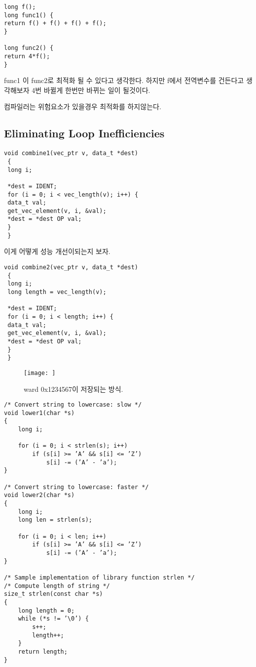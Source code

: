 \begin{lstlisting}[style = CStyle]
long f();
long func1() {
return f() + f() + f() + f();
}

long func2() {
return 4*f();
}
\end{lstlisting}
func1 이 func2로 최적화 될 수 있다고 생각한다. 하지만 f에서 전역변수를 건든다고 생각해보자 4번 바뀔게 한번만 바뀌는 일이 될것이다.

컴파일러는 위험요소가 있을경우 최적화를 하지않는다.

\subsection{Eliminating Loop Inefficiencies}

\begin{lstlisting}[style = CStyle]
void combine1(vec_ptr v, data_t *dest)
 {
 long i;

 *dest = IDENT;
 for (i = 0; i < vec_length(v); i++) {
 data_t val;
 get_vec_element(v, i, &val);
 *dest = *dest OP val;
 }
 }

\end{lstlisting}

이게 어떻게 성능 개선이되는지 보자.

\begin{lstlisting}[style = CStyle]
void combine2(vec_ptr v, data_t *dest)
 {
 long i;
 long length = vec_length(v);

 *dest = IDENT;
 for (i = 0; i < length; i++) {
 data_t val;
 get_vec_element(v, i, &val);
 *dest = *dest OP val;
 }
 }
\end{lstlisting}


\begin{figure}[h!]
    \centering
    \texttt{[image: ]}
    \caption{ward 0x1234567이 저장되는 방식.}
\end{figure}



\begin{lstlisting}[style = CStyle]
/* Convert string to lowercase: slow */
void lower1(char *s)
{
    long i;

    for (i = 0; i < strlen(s); i++)
        if (s[i] >= ’A’ && s[i] <= ’Z’)
            s[i] -= (’A’ - ’a’);    
}

/* Convert string to lowercase: faster */
void lower2(char *s)
{
    long i;
    long len = strlen(s);

    for (i = 0; i < len; i++)
        if (s[i] >= ’A’ && s[i] <= ’Z’)
            s[i] -= (’A’ - ’a’);
}

/* Sample implementation of library function strlen */
/* Compute length of string */
size_t strlen(const char *s)
{
    long length = 0;
    while (*s != ’\0’) {
        s++;
        length++;
    }
    return length;
}
\end{lstlisting}

